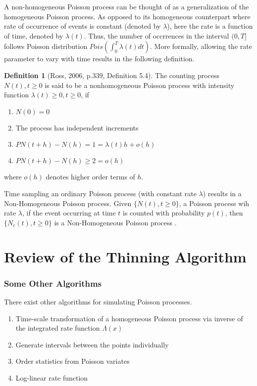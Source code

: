 \documentclass[%
 reprint,
 amsmath,amssymb,
 aps,
]{revtex4-2}
\theoremstyle{definition}
\newtheorem{definition}{Definition}[section]
\begin{document}
A non-homogeneous Poisson process can be thought of as a generalization of the homogeneous Poisson process. As opposed to its homogeneous counterpart where rate of occurrence of events is constant (denoted by $\lambda$), here the rate is a function of time, denoted by $\lambda(t)$. Thus, the number of occrrences in the interval $(0,T]$ follows Poisson distribution $Pois(\int_{0}^{T}\lambda(t)dt)$. More formally, allowing the rate parameter to vary with time results in the following definition.
\begin{definition}[Ross, 2006, p.339, Definition 5.4] \cite{Ross_2006} The counting process ${N(t), t \ge 0}$ is said to be a nonhomogeneous Poisson process with intensity function $\lambda(t) \ge 0, t \ge 0$, if
\begin{enumerate}
\item $N(0) = 0$
\item The process has independent increments
\item $P{N(t + h) - N(h) = 1} = \lambda(t)h + o(h)$
\item $P{N(t + h) - N(h) \ge 2} = o(h)$
\end{enumerate}
where $o(h)$ denotes higher order terms of $h$.
\end{definition}

Time sampling an ordinary Poisson process (with constant rate $\lambda$) results in a Non-Homogeneous Poisson process. Given $\{N(t), t \ge 0\}$, a Poisson process wih rate $\lambda$, if the event occurring at time $t$ is counted with probability $p(t)$, then $\{N_c(t) , t\ge 0\}$ is a Non-Homogeneous Poisson process \cite{Ross_2006}.

\section{\label{q:2}Review of the Thinning Algorithm}


\subsubsection{Some Other Algorithms}
There exist other algorithms for simulating Poisson processes.
\begin{enumerate}
\item Time-scale transformation of a homogeneous Poisson process via inverse of the integrated rate function $\Lambda(x)$
\item Generate intervals between the points individually
\item Order statistics from Poisson variates
\item Log-linear rate function
\end{enumerate}
\end{document}
